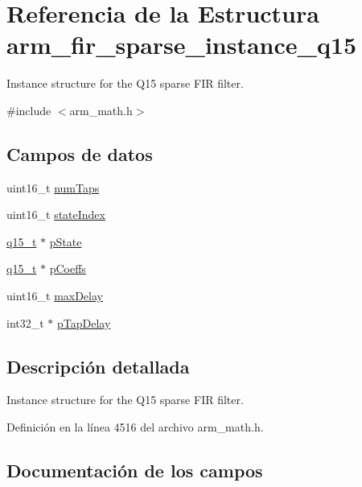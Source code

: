 \hypertarget{structarm__fir__sparse__instance__q15}{}\section{Referencia de la Estructura arm\+\_\+fir\+\_\+sparse\+\_\+instance\+\_\+q15}
\label{structarm__fir__sparse__instance__q15}


Instance structure for the Q15 sparse F\+IR filter.  




{\ttfamily \#include $<$arm\+\_\+math.\+h$>$}

\subsection*{Campos de datos}
\begin{DoxyCompactItemize}
\item 
uint16\+\_\+t \hyperlink{structarm__fir__sparse__instance__q15_a751941891e47f522a7f5375fe8990aac}{num\+Taps}
\item 
uint16\+\_\+t \hyperlink{structarm__fir__sparse__instance__q15_a566a0cb53437e48b9a3bf18e5b03d8aa}{state\+Index}
\item 
\hyperlink{arm__math_8h_ab5a8fb21a5b3b983d5f54f31614052ea}{q15\+\_\+t} $\ast$ \hyperlink{structarm__fir__sparse__instance__q15_ae29dfdb736374fcddaeaec4b7770170c}{p\+State}
\item 
\hyperlink{arm__math_8h_ab5a8fb21a5b3b983d5f54f31614052ea}{q15\+\_\+t} $\ast$ \hyperlink{structarm__fir__sparse__instance__q15_a7ca181a37f714d174445f486bebce26f}{p\+Coeffs}
\item 
uint16\+\_\+t \hyperlink{structarm__fir__sparse__instance__q15_ab25f4ee7550e6d92acff77ada283733f}{max\+Delay}
\item 
int32\+\_\+t $\ast$ \hyperlink{structarm__fir__sparse__instance__q15_adec00b3793ab4f08edfeb4ea6a9eb6e6}{p\+Tap\+Delay}
\end{DoxyCompactItemize}


\subsection{Descripción detallada}
Instance structure for the Q15 sparse F\+IR filter. 

Definición en la línea 4516 del archivo arm\+\_\+math.\+h.



\subsection{Documentación de los campos}
